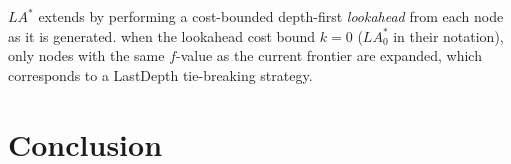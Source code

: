
$LA^*$ \cite{stern2010look} extends \astar by performing a
cost-bounded depth-first \emph{lookahead} from each node as it is generated.
when the lookahead cost bound $k=0$ ($LA^*_0$ in their notation), only nodes with the same $f$-value as the current \astar frontier are expanded, which corresponds to a LastDepth tie-breaking strategy.


\section{Conclusion}

